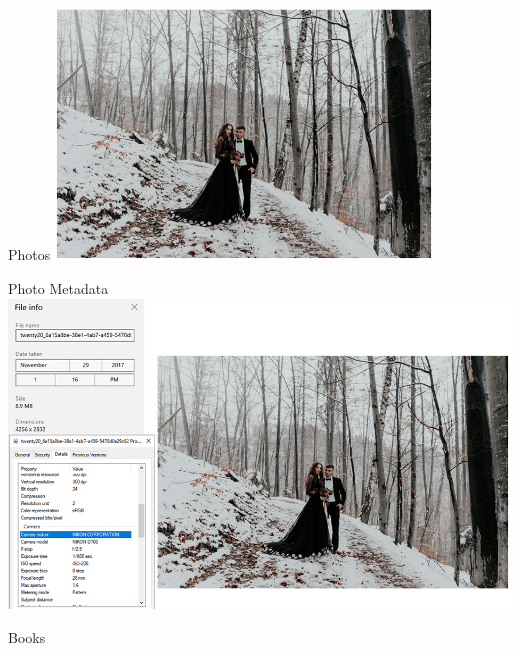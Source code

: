 \documentclass{beamer}
\begin{document}
\begin{frame}{Photos}
    \centering
    \includegraphics[width=0.75\textwidth]{figures/photo}
\end{frame}
\begin{frame}{Photo Metadata}
    \centering
    \includegraphics[width=\textwidth]{figures/photometa}
\end{frame}
\begin{frame}{Books}
    \centering
\end{frame}
\end{document}
